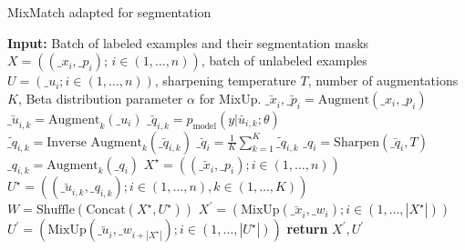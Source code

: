 \begin{algorithm}[t]
    \caption{MixMatch adapted for segmentation}
    \label{alg:mixmatch-seg}
    \begin{algorithmic}[1]
      \State \textbf{Input:} Batch of labeled examples and their segmentation masks $X = ((\_{x}_i, \_{p}_i);\,i \in (1, \dots, n))$, batch of unlabeled examples $U = (\_{u}_i; i \in (1, \dots, n))$, sharpening temperature $T$, number of augmentations $K$, Beta distribution parameter $\alpha$ for MixUp.
       \State $\bar{\_x}_i,\bar{\_p}_i = \text{Augment}(\_x_i,\_p_i)$ 
        \State $\bar{\_u}_{i,k} = \text{Augment}_k(\_u_i)$ 
        \State $\bar{\_q}_{i,k} = p_{\text{model}}(y|\bar{u}_{i,k}; \theta)$
       \EndFor
       \State $\tilde{\_q}_{i,k} = \text{Inverse Augment}_k(\bar{\_q}_{i,k})$ 
       \State $\bar{\_q}_i = \frac{1}{K} \sum_{k=1}^{K} \tilde{\_q}_{i,k} $
       \State $\_q_i = \text{Sharpen}(\bar{\_q}_i, T)$ 
        \State $\_q_{i,k} = \text{Augment}_k(\_q_i)$ 
       \EndFor
      \EndFor
      \State $X^\star = ((\bar{\_x}_i, \_p_i); i \in (1, \dots, n))$ 
      \State $U^\star = ((\bar{\_u}_{i,k}, \_q_{i,k}); i \in (1, \dots, n), k \in (1, \dots, K))$ 
      \State $W = \text{Shuffle}(\text{Concat}(X^\star, U^\star))$ 
      \State $X^\prime = (\text{MixUp}(\bar{\_x}_i, \_w_i); i \in (1, \dots, |X^\star|))$ 
      \State $U^\prime = (\text{MixUp}(\bar{\_u}_{i}, \_w_{i+|X^\star|}); i \in (1, \dots, |U^\star|))$ 
      \State \textbf{return} $X^\prime, U^\prime$
      
    \end{algorithmic}
   \end{algorithm}